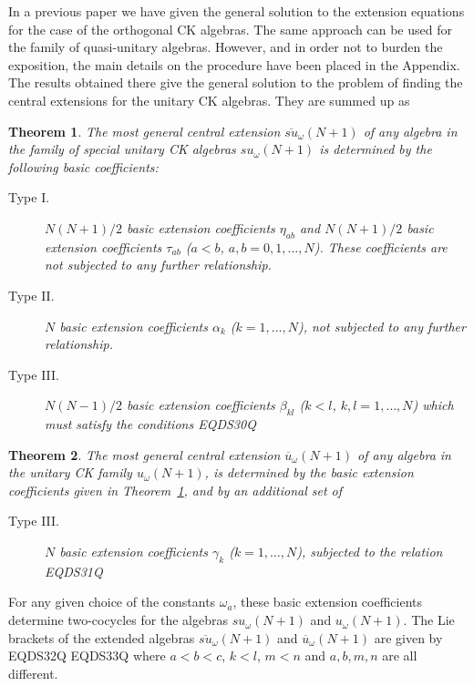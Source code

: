 \documentclass[12pt]{article}
\newtheorem{theorem}{Theorem}[section]
\begin{document}
In a previous paper \cite{Azc.Her.Bue.San:96}
we have given the general solution to
the extension equations for the case of the  orthogonal CK algebras.
The same approach can be used for the   family of
quasi-unitary algebras. However, and in order not to burden the
exposition, the main details on the procedure have been placed in the Appendix.
The results obtained there give the  general solution to the problem of
finding the central extensions for the unitary CK
algebras. They are summed up as

\begin{theorem}
\label{theor3.1}
The most general central extension $\overline{su}_{\omega}(N+1)$ of
any algebra in the family of special unitary CK algebras
${su}_{\omega}(N+1)$ is determined by the following \emph{basic}
coefficients:
\begin{description}
\item[Type I.]
$N(N+1)/2$ basic extension coefficients ${\eta}_{ab}$ and
$N(N+1)/2$ basic extension coefficients ${\tau}_{ab}$  ($a<b$,
$a,b=0,1,\dots,N$). These coefficients are not subjected to any
further relationship.

\item[Type II.] $N$ basic extension coefficients ${\alpha}_{k}$
($k=1,\dots,N$), not subjected to any further relationship.

\item[Type III.] $N(N-1)/2$ basic extension coefficients ${\beta}_{kl}$
($k<l$, $k,l=1,\dots,N$) which must satisfy the conditions
EQDS30Q
\end{description}
\end{theorem}

\begin{theorem}
\label{theor3.2}
The most general central extension $\overline{u}_{\omega}(N+1)$ of
any algebra in the unitary CK family
${u}_{\omega}(N+1)$, is determined by the basic extension
coefficients given in Theorem~\ref{theor3.1}, and by an additional set of

\begin{description}
\item[Type III.]
$N$ basic extension coefficients ${\gamma}_{k}$
($k=1,\dots,N$), subjected to the relation
EQDS31Q
\end{description}
\end{theorem}
For any given choice of the constants ${\omega}_a$, these basic extension
coefficients determine two-cocycles for the algebras
${su}_{\omega}(N+1)$ and
${u}_{\omega}(N+1)$. The Lie brackets of the extended algebras
$\overline{su}_{\omega}(N+1)$ and $\overline{u}_{\omega}(N+1)$ are
given by
EQDS32Q
EQDS33Q
where $a<b<c$, $k<l$, $m<n$  and $a,b,m,n$ are all different.
\end{document}
